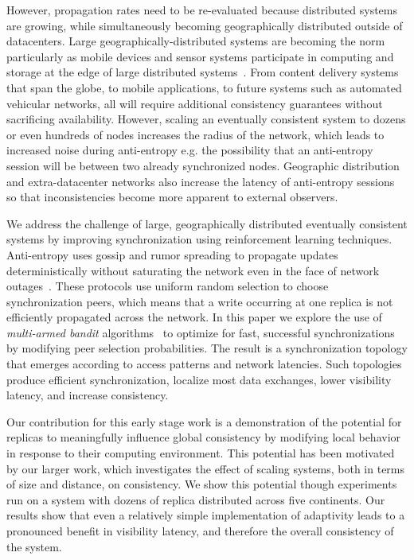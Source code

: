 However, propagation rates need to be re-evaluated because
distributed systems are growing, while simultaneously becoming geographically distributed
outside of datacenters.
Large geographically-distributed systems are becoming the norm particularly
as mobile devices and sensor systems participate in computing and storage at
the edge of large distributed
systems~\cite{edge_computing,geo_cdn}.
From content delivery systems that span the globe, to mobile applications, to
future systems such as automated vehicular networks, all will require
additional consistency guarantees without sacrificing availability.
However, scaling an eventually consistent system to dozens or even hundreds
of nodes increases the radius of the network, which leads to increased noise
during anti-entropy e.g. the possibility that an anti-entropy session will be
between two already synchronized nodes.
Geographic distribution and extra-datacenter networks also increase the
latency of anti-entropy sessions so that inconsistencies become more apparent
to external observers.

We address the challenge of large, geographically distributed eventually
consistent systems by improving synchronization using reinforcement
learning techniques.
Anti-entropy uses gossip and rumor spreading to propagate updates
deterministically without saturating the
network even in the face of network
outages~\cite{gossip_protocols,rumor_spreading,rumor_spreading_dynamics}.
These protocols use uniform random selection to choose synchronization peers,
which means that a write occurring at one replica is not efficiently
propagated across the network.
In this paper we explore the use of \textit{multi-armed bandit}
algorithms~\cite{epoch_greedy_mab,contextual_bandits} to optimize
for fast, successful synchronizations by modifying peer selection
probabilities.
The result is a synchronization topology that emerges according to access
patterns and network latencies.
Such topologies produce efficient synchronization,
localize most data exchanges, lower visibility latency, and increase
consistency.

Our contribution for this early stage work is a demonstration of the
potential for replicas to meaningfully influence global consistency by
modifying local behavior in response to their computing environment.
This potential has been motivated by our larger work, which investigates the
effect of scaling systems, both in terms of size and distance, on consistency.
We show this potential though experiments run on a system with dozens of
replica distributed across five continents.
Our results show that even a relatively
simple implementation of adaptivity leads to a pronounced benefit in
visibility latency, and therefore the overall consistency of the system.


